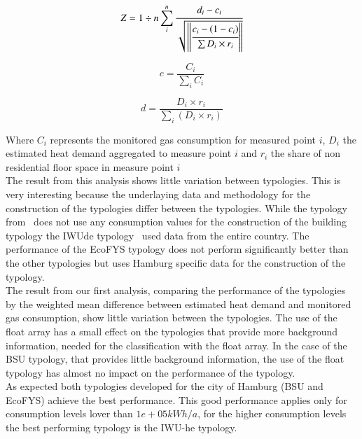 \documentclass[authoryear,preprint,review,12pt]{elsarticle}
\begin{document}
\begin{linenumbers}
\begin{equation}\label{eq:wsz}
  Z =1 \div n\sum_i^n \cfrac{d_i-c_i}{\sqrt{ \left \|
  	  \cfrac{c_i-\left(1-c_i\right)}{\sum{D_i \times r_i}}
  	  \right \|
  	  }}
\end{equation}

\begin{equation} \label{eq:wsz-p}
  c = \frac{C_i}{\sum_i{C_i}}
\end{equation} 

\begin{equation} \label{eq:wsz-E}
  d = \frac{D_{i} \times r_{i}}{\sum_i{\left(D_{i} \times r_{i}\right)
  }}
\end{equation}

Where
$C_i$ represents the monitored gas consumption for measured point $i$,
$D_i$ the estimated heat demand aggregated to measure point $i$ and
$r_i$ the share of non residential floor space in measure point $i$\\




The result from this analysis shows little variation between typologies. This
is very interesting because the underlaying data and methodology for the
construction of the typologies differ between the typologies. While the
typology from~\cite{Blesl.2002} does not use any consumption values for the
construction of the building typology the IWUde typology~\cite{IWU.2003} used
data from the entire country. The performance of the EcoFYS typology does not
perform significantly better than the other typologies but uses Hamburg
specific data for the construction of the typology.\\

The result from our first analysis, comparing the performance of the typologies
by the weighted mean difference between estimated heat demand and monitored gas
consumption, show little variation between the typologies. The use of the float
array has a small effect on the typologies that provide more background
information, needed for the classification with the float array. In the case of
the BSU typology, that provides little background information, the use of the
float typology has almost no impact on the performance of the typology.\\

As expected both typologies developed for the city of Hamburg (BSU and EcoFYS)
achieve the best performance. This good performance applies only for
consumption levels lover than $1e+05 kWh/a$, for the higher consumption levels
the best performing typology is the IWU-he typology.\\ 


\end{linenumbers}
\end{document}
